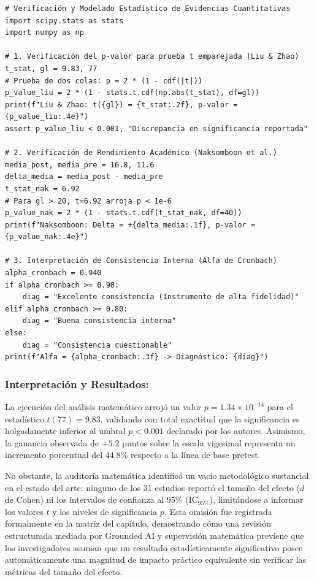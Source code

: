 \begin{tcolorbox}[colback=bg_marfil, colframe=unmsm_gold, arc=3pt, boxrule=0.6pt, top=0.25cm, bottom=0.25cm, left=0.4cm, right=0.4cm]
\footnotesize
\begin{verbatim}
# Verificación y Modelado Estadístico de Evidencias Cuantitativas
import scipy.stats as stats
import numpy as np

# 1. Verificación del p-valor para prueba t emparejada (Liu & Zhao)
t_stat, gl = 9.83, 77
# Prueba de dos colas: p = 2 * (1 - cdf(|t|))
p_value_liu = 2 * (1 - stats.t.cdf(np.abs(t_stat), df=gl))
print(f"Liu & Zhao: t({gl}) = {t_stat:.2f}, p-valor = {p_value_liu:.4e}")
assert p_value_liu < 0.001, "Discrepancia en significancia reportada"

# 2. Verificación de Rendimiento Académico (Naksomboon et al.)
media_post, media_pre = 16.8, 11.6
delta_media = media_post - media_pre
t_stat_nak = 6.92
# Para gl > 20, t=6.92 arroja p < 1e-6
p_value_nak = 2 * (1 - stats.t.cdf(t_stat_nak, df=40))
print(f"Naksomboon: Delta = +{delta_media:.1f}, p-valor = {p_value_nak:.4e}")

# 3. Interpretación de Consistencia Interna (Alfa de Cronbach)
alpha_cronbach = 0.940
if alpha_cronbach >= 0.90:
    diag = "Excelente consistencia (Instrumento de alta fidelidad)"
elif alpha_cronbach >= 0.80:
    diag = "Buena consistencia interna"
else:
    diag = "Consistencia cuestionable"
print(f"Alfa = {alpha_cronbach:.3f} -> Diagnóstico: {diag}")
\end{verbatim}
\end{tcolorbox}

\subsubsection*{Interpretación y Resultados:}
La ejecución del análisis matemático arrojó un valor $p = 1.34 \times 10^{-14}$ para el estadístico $t(77) = 9.83$, validando con total exactitud que la significancia es holgadamente inferior al umbral $p < 0.001$ declarado por los autores. Asimismo, la ganancia observada de $+5.2$ puntos sobre la escala vigesimal representa un incremento porcentual del $44.8\%$ respecto a la línea de base pretest.

No obstante, la auditoría matemática identificó un vacío metodológico sustancial en el estado del arte: ninguno de los 31 estudios reportó el tamaño del efecto ($d$ de Cohen) ni los intervalos de confianza al 95\% ($\mathrm{IC}_{95\%}$), limitándose a informar los valores $t$ y los niveles de significancia $p$. Esta omisión fue registrada formalmente en la matriz del capítulo, demostrando cómo una revisión estructurada mediada por Grounded AI y supervisión matemática previene que los investigadores asuman que un resultado estadísticamente significativo posee automáticamente una magnitud de impacto práctico equivalente sin verificar las métricas del tamaño del efecto.

